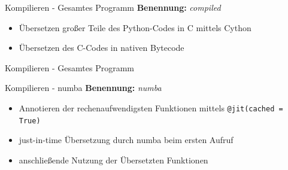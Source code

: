 \begin{frame}{Kompilieren - Gesamtes Programm}
	\textbf{Benennung:} \textit{compiled}
	\begin{itemize}
		\item Übersetzen großer Teile des Python-Codes in C mittels Cython
		\item Übersetzen des C-Codes in nativen Bytecode
	\end{itemize}
\end{frame}

\begin{frame}{Kompilieren - Gesamtes Programm}
	\centering
\end{frame}

\begin{frame}{Kompilieren - numba}
	\textbf{Benennung:} \textit{numba}
	\begin{itemize}
		\item Annotieren der rechenaufwendigsten Funktionen mittels \texttt{@jit(cached = True)}
		\item just-in-time Übersetzung durch numba beim ersten Aufruf
		\item anschließende Nutzung der Übersetzten Funktionen
	\end{itemize}
\end{frame}


